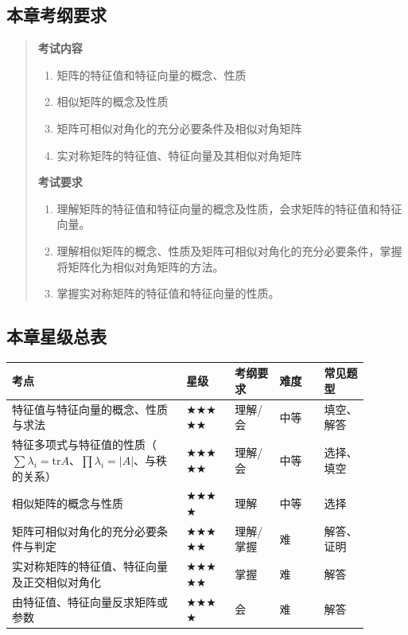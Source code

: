 \documentclass[11pt,openany,UTF8]{ctexbook}
\begin{document}
\subsection*{本章考纲要求}

\begin{quote}
\textbf{考试内容}

\begin{enumerate}
\item 矩阵的特征值和特征向量的概念、性质
\item 相似矩阵的概念及性质
\item 矩阵可相似对角化的充分必要条件及相似对角矩阵
\item 实对称矩阵的特征值、特征向量及其相似对角矩阵
\end{enumerate}
\textbf{考试要求}

\begin{enumerate}
\item 理解矩阵的特征值和特征向量的概念及性质，会求矩阵的特征值和特征向量。
\item 理解相似矩阵的概念、性质及矩阵可相似对角化的充分必要条件，掌握将矩阵化为相似对角矩阵的方法。
\item 掌握实对称矩阵的特征值和特征向量的性质。
\end{enumerate}
\end{quote}
\subsection*{本章星级总表}

\begingroup\small\setlength{\tabcolsep}{4.0pt}
\begin{longtable}{@{}L{0.4308\linewidth}L{0.1219\linewidth}L{0.1138\linewidth}L{0.1138\linewidth}L{0.1138\linewidth}@{}}
\toprule
\textbf{考点} & \textbf{星级} & \textbf{考纲要求} & \textbf{难度} & \textbf{常见题型} \\
\midrule
\endhead
特征值与特征向量的概念、性质与求法 & $\bigstar$$\bigstar$$\bigstar$$\bigstar$$\bigstar$ & 理解/会 & 中等 & 填空、解答 \\
特征多项式与特征值的性质（$\sum\lambda_i=\mathrm{tr}A$、$\prod\lambda_i=\vert A\vert$、与秩的关系） & $\bigstar$$\bigstar$$\bigstar$$\bigstar$$\bigstar$ & 理解/会 & 中等 & 选择、填空 \\
相似矩阵的概念与性质 & $\bigstar$$\bigstar$$\bigstar$$\bigstar$ & 理解 & 中等 & 选择 \\
矩阵可相似对角化的充分必要条件与判定 & $\bigstar$$\bigstar$$\bigstar$$\bigstar$$\bigstar$ & 理解/掌握 & 难 & 解答、证明 \\
实对称矩阵的特征值、特征向量及正交相似对角化 & $\bigstar$$\bigstar$$\bigstar$$\bigstar$$\bigstar$ & 掌握 & 难 & 解答 \\
由特征值、特征向量反求矩阵或参数 & $\bigstar$$\bigstar$$\bigstar$$\bigstar$ & 会 & 难 & 解答 \\
\bottomrule
\end{longtable}
\endgroup
\end{document}
